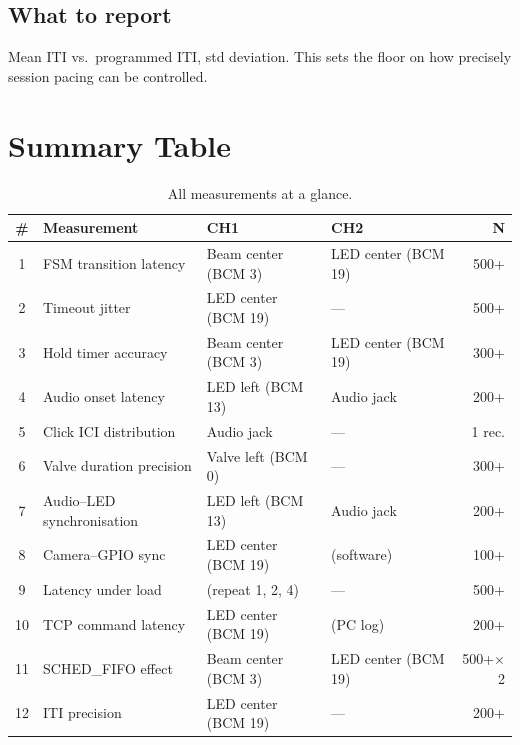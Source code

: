 \documentclass[11pt, a4paper]{article}
\begin{document}
\subsection*{What to report}

Mean ITI vs.\ programmed ITI, std deviation. This sets the floor on how
precisely session pacing can be controlled.

\newpage

\section*{Summary Table}

\begin{table}[h!]
\centering
\small
\begin{tabular}{clllr}
\toprule
\textbf{\#} & \textbf{Measurement} & \textbf{CH1} & \textbf{CH2} & \textbf{N} \\
\midrule
1  & FSM transition latency        & Beam center (BCM 3)   & LED center (BCM 19) & 500+ \\
2  & Timeout jitter                & LED center (BCM 19)   & ---                 & 500+ \\
3  & Hold timer accuracy           & Beam center (BCM 3)   & LED center (BCM 19) & 300+ \\
4  & Audio onset latency           & LED left (BCM 13)     & Audio jack          & 200+ \\
5  & Click ICI distribution        & Audio jack            & ---                 & 1 rec. \\
6  & Valve duration precision      & Valve left (BCM 0)    & ---                 & 300+ \\
7  & Audio--LED synchronisation    & LED left (BCM 13)     & Audio jack          & 200+ \\
8  & Camera--GPIO sync             & LED center (BCM 19)   & (software)          & 100+ \\
9  & Latency under load            & (repeat 1, 2, 4)      & ---                 & 500+ \\
10 & TCP command latency           & LED center (BCM 19)   & (PC log)            & 200+ \\
11 & SCHED\_FIFO effect            & Beam center (BCM 3)   & LED center (BCM 19) & 500+$\times$2 \\
12 & ITI precision                 & LED center (BCM 19)   & ---                 & 200+ \\
\bottomrule
\end{tabular}
\caption{All measurements at a glance.}
\end{table}
\end{document}

